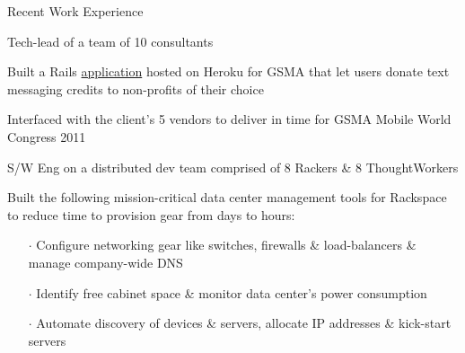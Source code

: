 \documentclass{resume} %
\begin{document}
\begin{rSection}{Recent Work Experience}
\begin{rSubsection}{}{}{}{}{Tech-lead of a team of 10 consultants}
\item Built a Rails \href{https://github.com/TheHiveProjects}{application} hosted on Heroku for GSMA that let users donate text messaging credits to non-profits of their choice
  \item Interfaced with the client's 5 vendors to deliver in time for GSMA Mobile World Congress 2011

\end{rSubsection}\vspace{-1em}



\begin{rSubsection}{}{}{}{}
{S/W Eng on a distributed dev team comprised of 8 Rackers \& 8 ThoughtWorkers}

\item Built the following mission-critical data center management tools for Rackspace to reduce time to provision gear from days to hours:
\vspace{-0.5em}
\begin{itemize}  \itemsep0.5pt \parskip0pt
    \item[$\cdot$] Configure networking gear like switches, firewalls \& load-balancers \& manage company-wide DNS
    \item[$\cdot$] Identify free cabinet space \& monitor data center's power consumption
    \item[$\cdot$] Automate discovery of devices \& servers, allocate IP addresses \& kick-start servers
\end{itemize}

\end{rSubsection}







\end{rSection}
\end{document}
